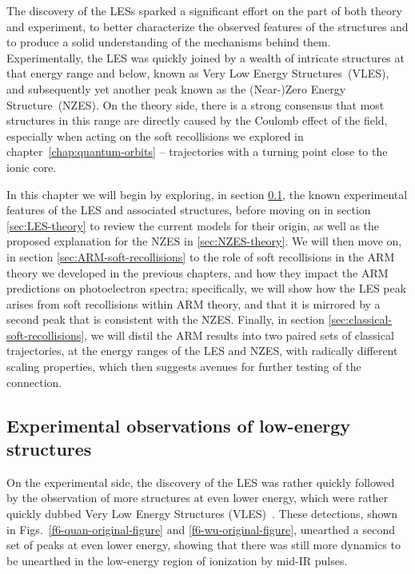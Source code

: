 The discovery of the LESs sparked a significant effort on the part of both theory and experiment, to better characterize the observed features of the structures and to produce a solid understanding of the mechanisms behind them. Experimentally, the LES was quickly joined by a wealth of intricate structures at that energy range and below, known as Very Low Energy Structures~(VLES), and subsequently yet another peak known as the \mbox{(Near-)Zero} Energy Structure~(NZES). On the theory side, there is a strong consensus that most structures in this range are directly caused by the Coulomb effect of the field, especially when acting on the soft recollisions we explored in chapter~\ref{chap:quantum-orbits} -- trajectories with a turning point close to the ionic core.

In this chapter we will begin by exploring, in section \ref{sec:LES-experiment}, the known experimental features of the LES and associated structures, before moving on in section \ref{sec:LES-theory} to review the current models for their origin, as well as the proposed explanation for the NZES in \ref{sec:NZES-theory}. We will then move on, in section \ref{sec:ARM-soft-recollisions} to the role of soft recollisions in the ARM theory we developed in the previous chapters, and how they impact the ARM predictions on photoelectron spectra; specifically, we will show how the LES peak arises from soft recollisions within ARM theory, and that it is mirrored by a second peak that is consistent with the NZES. Finally, in section \ref{sec:classical-soft-recollisions}, we will distil the ARM results into two paired sets of classical trajectories, at the energy ranges of the LES and NZES, with radically different scaling properties, which then suggests avenues for further testing of the connection.



\subsection{Experimental observations of low-energy structures}
\label{sec:LES-experiment}

On the experimental side, the discovery of the LES was rather quickly followed by the observation of more structures at even lower energy, which were rather quickly dubbed Very Low Energy Structures (VLES)~\cite{VLES_initial, VLES_characterization}. These detections, shown in Figs.~\ref{f6-quan-original-figure} and \ref{f6-wu-original-figure}, unearthed a second set of peaks at even lower energy, showing that there was still more dynamics to be unearthed in the low-energy region of ionization by mid-IR pulses. 

